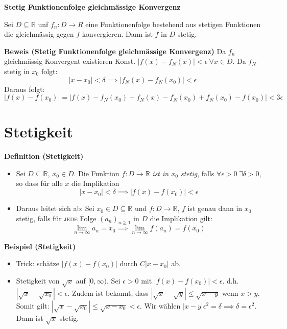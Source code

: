 \documentclass[25pt]{sciposter}
\newcommand{\limm}{\lim\limits_{n \to \infty}}
\newcommand{\R}{\mathbb{R}}
\newenvironment{method}[1]{\begin{mdframed}[backgroundcolor=blue!10,innertopmargin=15pt, innerbottommargin=15pt, nobreak=true]
		\textbf{#1 }
	}
	{ 
	\end{mdframed}
}
\begin{document}
\begin{multicols}{3}
\begin{method}{Stetig Funktionenfolge gleichmässige Konvergenz}
	Sei $D \subseteq \R$ unf $f_n: D \to R$ eine Funktionenfolge bestehend aus stetigen Funktionen die gleichmässig gegen $f$ konvergieren. Dann ist $f$ in $D$ stetig.
\end{method}

\textbf{Beweis (Stetig Funktionenfolge gleichmässige Konvergenz)}
Da $f_n$ gleichmässig Konvergent existieren Konst. $|f(x) - f_N(x)| < \epsilon \ \forall x \in D$. Da $f_N$ stetig in $x_0$ folgt:
$$|x - x_0| < \delta \implies |f_N(x) - f_N(x_0)| < \epsilon$$
Daraus folgt: $$|f(x) - f(x_0)| = |f(x) - f_N(x_0) + f_N(x) - f_N(x_0) + f_N(x_0) - f(x_0)| < 3 \epsilon$$














\section{Stetigkeit}
\begin{method}{Definition (Stetigkeit)}
	\begin{itemize}
		\item Sei $D \subseteq \mathbb{R}$, $x_0 \in D$. Die Funktion $f:D \to \R$ \textit{ist in $x_0$ stetig}, falls $\forall \epsilon > 0 \ \exists \delta > 0$, so dass für alle $x$ die Implikation $$|x-x_0| < \delta \implies |f(x) - f(x_0)| < \epsilon$$
		
		\item Daraus leitet sich ab: Sei $x_0 \in D \subseteq \R$ und $f:D \to \R$, $f$ ist genau dann in $x_0$ stetig, falls für \textsc{jede} Folge $(a_n)_{n \geq 1}$ in $D$ die Implikation gilt:$$\lim\limits_{n \to \infty} a_n = x_0 \implies \limm f(a_n) = f(x_0)$$
	\end{itemize}

\end{method}

\textbf{Beispiel (Stetigkeit)}
\begin{itemize}
	\item Trick: schätze $|f(x)-f(x_0)|$ durch $C|x-x_0|$ ab. 
	\item Stetigkeit von $\sqrt{x}$ auf $[0, \infty)$. Sei $\epsilon > 0 $ mit $|f(x)-f(x_0)| < \epsilon$. d.h. $|\sqrt{x} - \sqrt{x_0}|< \epsilon$. Zudem ist bekannt, dass $|\sqrt{x} - \sqrt{y}|\leq\sqrt{x-y}$ wenn $x > y$. Somit gilt: $|\sqrt{x} - \sqrt{x_0}|\leq \sqrt{x - x_0}<\epsilon$. Wir wählen $|x-y|\epsilon^2 = \delta \implies \delta = \epsilon^2$. Dann ist $\sqrt{x}$ stetig.
\end{itemize}


\end{multicols}
\end{document}
